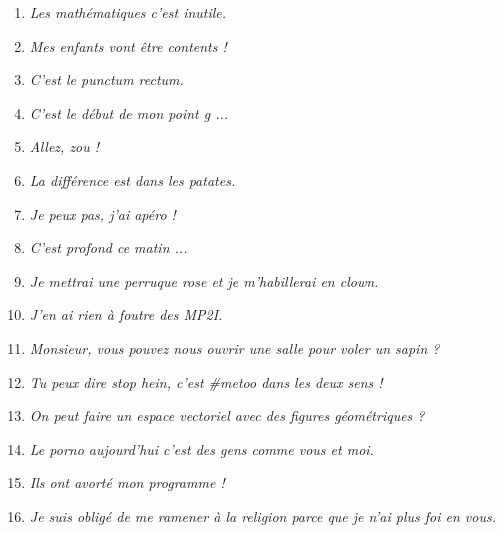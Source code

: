 \documentclass[french,bookmarks]{article}
\begin{document}
    \begin{minipage}{0.60\linewidth}
        \begin{enumerate}
            \item[\bullet] \textit{Les mathématiques c'est inutile.}
            
            \item[\bullet] \textit{Mes enfants vont être contents !}
            
            \item[\bullet] \textit{C'est le punctum rectum.}
            
            \item[\bullet] \textit{C'est le début de mon point g ...}
            
            \item[\bullet] \textit{Allez, zou !}
            
            \item[\bullet] \textit{La différence est dans les patates.}
            
            \item[\bullet] \textit{Je peux pas, j'ai apéro !}
            
            \item[\bullet] \textit{C'est profond ce matin ...}
            
            \item[\bullet] \textit{Je mettrai une perruque rose et je m'habillerai en clown.}
            
            \item[\bullet] \textit{J'en ai rien à foutre des MP2I.}
            
            \item[\bullet] \textit{Monsieur, vous pouvez nous ouvrir une salle pour voler un sapin ?}
            
            \item[\bullet] \textit{Tu peux dire stop hein, c'est \#metoo dans les deux sens !}
            
            \item[\bullet] \textit{On peut faire un espace vectoriel avec des figures géométriques ?}
            
            \item[\bullet] \textit{Le porno aujourd'hui c’est des gens comme vous et moi.}
            
            \item[\bullet] \textit{Ils ont avorté mon programme !}
            
            \item[\bullet] \textit{Je suis obligé de me ramener à la religion parce que je n'ai plus foi en vous.}
        \end{enumerate}
    \end{minipage}
    
\end{document}
